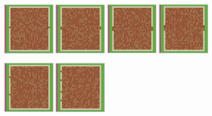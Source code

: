 \documentclass[12pt,letterpaper]{article}
\begin{document}
\begin{figure}[!ht]
  \begin{minipage}[b]{.75\linewidth}
    \includegraphics[width=0.24\textwidth]{./figures/exit_dims_2_b.png}
    \includegraphics[width=0.24\textwidth]{./figures/exit_dims_4_b.png}
    \includegraphics[width=0.24\textwidth]{./figures/exit_dims_6_b.png}
    \includegraphics[width=0.24\textwidth]{./figures/exit_dims_8_b.png}
  \end{minipage}
  \begin{minipage}[b]{.75\linewidth}
    \includegraphics[width=0.24\textwidth]{./figures/exit_dims_2_c.png}
    \includegraphics[width=0.24\textwidth]{./figures/exit_dims_4_c.png}

\end{minipage}
\end{figure}
\end{document}
